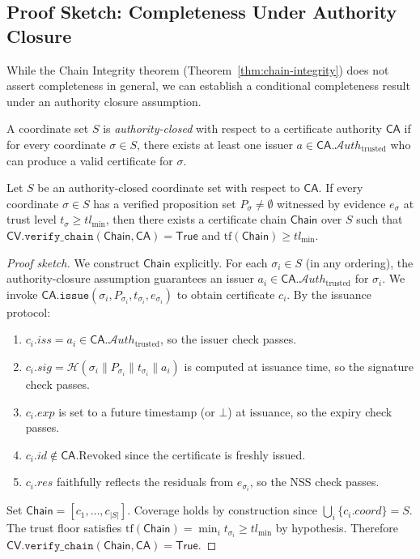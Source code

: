\documentclass[11pt]{article}
\newcommand{\Chain}{\mathsf{Chain}}            %
\newcommand{\CA}{\mathsf{CA}}                  %
\newcommand{\CV}{\mathsf{CV}}                  %
\newcommand{\certid}{\mathit{id}}              %
\newcommand{\certcoord}{\mathit{coord}}        %
\newcommand{\certtrust}{\mathit{tl}}           %
\newcommand{\certissuer}{\mathit{iss}}         %
\newcommand{\certsig}{\mathit{sig}}            %
\newcommand{\certresid}{\mathit{res}}          %
\newcommand{\certexpiry}{\mathit{exp}}         %
\newcommand{\Revoked}{\mathrm{Revoked}}        %
\newcommand{\Sigalg}{\mathcal{H}}              %
\newcommand{\AuthSet}{\mathcal{A}\!\mathit{uth}} %
\begin{document}
\subsection{Proof Sketch: Completeness Under Authority Closure}\label{sec:completeness-proof}

While the Chain Integrity theorem (Theorem~\ref{thm:chain-integrity})
does not assert completeness in general, we can establish a conditional
completeness result under an authority closure assumption.

\begin{definition}\label{def:auth-closed}
A coordinate set $S$ is \emph{authority-closed} with respect to a
certificate authority $\CA$ if for every coordinate $\sigma \in S$,
there exists at least one issuer $a \in \CA.\AuthSet_{\mathrm{trusted}}$
who can produce a valid certificate for $\sigma$.
\end{definition}

\begin{theorem}\label{thm:conditional-completeness}
Let $S$ be an authority-closed coordinate set with respect to $\CA$.
If every coordinate $\sigma \in S$ has a verified proposition set
$P_\sigma \ne \emptyset$ witnessed by evidence $e_\sigma$ at trust
level $t_\sigma \ge \certtrust_{\min}$, then there exists a certificate
chain $\Chain$ over $S$ such that
$\CV.\texttt{verify\_chain}(\Chain, \CA) = \mathsf{True}$
and $\mathrm{tf}(\Chain) \ge \certtrust_{\min}$.
\end{theorem}

\begin{proof}[Proof sketch]
We construct $\Chain$ explicitly.  For each $\sigma_i \in S$
(in any ordering), the authority-closure assumption guarantees an
issuer $a_i \in \CA.\AuthSet_{\mathrm{trusted}}$ for $\sigma_i$.
We invoke $\CA.\texttt{issue}(\sigma_i, P_{\sigma_i}, t_{\sigma_i}, e_{\sigma_i})$
to obtain certificate $c_i$.  By the issuance protocol:
\begin{enumerate}
  \item $c_i.\certissuer = a_i \in \CA.\AuthSet_{\mathrm{trusted}}$, so the
        issuer check passes.
  \item $c_i.\certsig = \Sigalg(\sigma_i \| P_{\sigma_i} \| t_{\sigma_i} \| a_i)$
        is computed at issuance time, so the signature check passes.
  \item $c_i.\certexpiry$ is set to a future timestamp (or $\bot$) at issuance,
        so the expiry check passes.
  \item $c_i.\certid \notin \CA.\Revoked$ since the certificate is freshly issued.
  \item $c_i.\certresid$ faithfully reflects the residuals from $e_{\sigma_i}$,
        so the NSS check passes.
\end{enumerate}
Set $\Chain = [c_1, \ldots, c_{|S|}]$.  Coverage holds by construction
since $\bigcup_i \{c_i.\certcoord\} = S$.  The trust floor satisfies
$\mathrm{tf}(\Chain) = \min_i t_{\sigma_i} \ge \certtrust_{\min}$ by
hypothesis.  Therefore $\CV.\texttt{verify\_chain}(\Chain, \CA) = \mathsf{True}$.
\end{proof}
\end{document}
